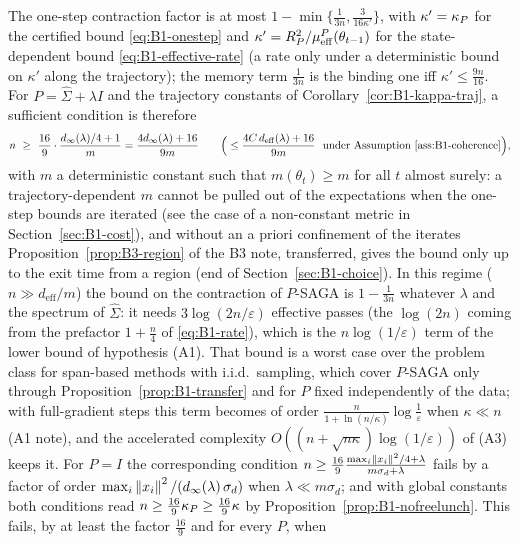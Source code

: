 \begin{remark}\label{rem:B1-memory-bottleneck}
The one-step contraction factor is at most $1-\min\{\frac1{3n},\frac{3}{16\kappa'}\}$, with $\kappa'=\kappa_P$
for the certified bound \eqref{eq:B1-onestep} and $\kappa'=R_P^2/\mu_{\mathrm{eff}}^P(\theta_{t-1})$ for the state-dependent
bound \eqref{eq:B1-effective-rate} (a rate only under a deterministic bound on $\kappa'$ along the trajectory);
the memory term $\frac1{3n}$ is the binding one iff $\kappa'\le\frac{9n}{16}$. For
$P=\hat\Sigma+\lambda I$ and the trajectory constants of Corollary~\ref{cor:B1-kappa-traj}, a sufficient
condition is therefore
\begin{equation}\label{eq:B1-bottleneck-condition}
n\ \ge\ \frac{16}{9}\cdot\frac{d_\infty(\lambda)/4+1}{m}=\frac{4d_\infty(\lambda)+16}{9m}
\qquad\Big(\le\frac{4C\,d_{\mathrm{eff}}(\lambda)+16}{9m}\ \text{ under Assumption~\ref{ass:B1-coherence}}\Big),
\end{equation}
with $m$ a deterministic constant such that $m(\theta_t)\ge m$ for all $t$ almost surely: a
trajectory-dependent $m$ cannot be pulled out of the expectations when the one-step bounds are iterated (see
the case of a non-constant metric in Section~\ref{sec:B1-cost}), and without an a priori confinement of the
iterates Proposition~\ref{prop:B3-region} of the B3 note, transferred, gives the bound only up to the exit time
from a region (end of Section~\ref{sec:B1-choice}). In this regime ($n\gg d_{\mathrm{eff}}/m$) the bound on
the contraction of $P$-SAGA is $1-\frac1{3n}$ whatever $\lambda$ and the spectrum of $\hat\Sigma$: it needs
$3\log(2n/\varepsilon)$ effective passes (the $\log(2n)$ coming from the prefactor $1+\frac n4$ of
\eqref{eq:B1-rate}), which is the $n\log(1/\varepsilon)$ term of the lower bound of
hypothesis (A1). That bound is a worst case over the problem class for span-based methods with i.i.d.\ sampling,
which cover $P$-SAGA only through Proposition~\ref{prop:B1-transfer} and for $P$ fixed independently of the
data; with full-gradient steps this term becomes of order $\frac{n}{1+\ln(n/\kappa)}\log\frac1\varepsilon$ when $\kappa\ll n$
(A1 note), and the accelerated complexity $O((n+\sqrt{n\kappa})\log(1/\varepsilon))$ of (A3) keeps it. For $P=I$ the
corresponding condition $n\ge\frac{16}{9}\frac{\max_i\left\|x_i\right\|^2/4+\lambda}{m\sigma_d+\lambda}$ fails by a
factor of order $\max_i\left\|x_i\right\|^2/(d_\infty(\lambda)\,\sigma_d)$ when $\lambda\ll m\sigma_d$; and with
global constants both conditions read $n\ge\frac{16}{9}\kappa_P\ge\frac{16}{9}\kappa$ by
Proposition~\ref{prop:B1-nofreelunch}. This fails, by at least the factor $\frac{16}9$ and for every $P$, when

\end{remark}
